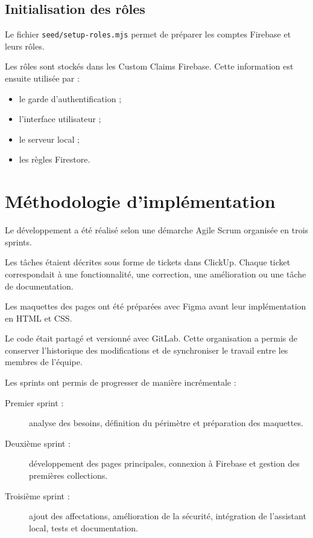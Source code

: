 \documentclass{rapportENSIAS}
\begin{document}
\subsection{Initialisation des rôles}

Le fichier \texttt{seed/setup-roles.mjs} permet de préparer les comptes Firebase et leurs rôles.

Les rôles sont stockés dans les Custom Claims Firebase. Cette information est ensuite utilisée par :

\begin{itemize}
    \item le garde d’authentification ;
    \item l’interface utilisateur ;
    \item le serveur local ;
    \item les règles Firestore.
\end{itemize}

\section{Méthodologie d’implémentation}

Le développement a été réalisé selon une démarche Agile Scrum organisée en trois sprints.

Les tâches étaient décrites sous forme de tickets dans ClickUp. Chaque ticket correspondait à une fonctionnalité, une correction, une amélioration ou une tâche de documentation.

Les maquettes des pages ont été préparées avec Figma avant leur implémentation en HTML et CSS.

Le code était partagé et versionné avec GitLab. Cette organisation a permis de conserver l’historique des modifications et de synchroniser le travail entre les membres de l’équipe.

Les sprints ont permis de progresser de manière incrémentale :

\begin{description}
    \item[Premier sprint :] analyse des besoins, définition du périmètre et préparation des maquettes.

    \item[Deuxième sprint :] développement des pages principales, connexion à Firebase et gestion des premières collections.

    \item[Troisième sprint :] ajout des affectations, amélioration de la sécurité, intégration de l’assistant local, tests et documentation.
\end{description}
\end{document}
